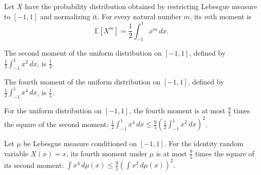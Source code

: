 \begin{theorem}
\label{FABL.integral_pow_uniformIntervalMeasure}
\leanok
{}
Let $X$ have the probability distribution obtained by restricting Lebesgue measure to
$[-1,1]$ and normalizing it. For every natural number $m$, its $m$th moment is
\[\mathbb E[X^m]=\frac12\int_{-1}^{1}x^m\,dx.\]
\end{theorem}

\begin{theorem}
\label{FABL.uniformIntervalMoment_two}
\leanok
{}
The second moment of the uniform distribution on $[-1,1]$, defined by
$\frac12\int_{-1}^{1}x^2\,dx$, is $\frac13$.
\end{theorem}

\begin{theorem}
\label{FABL.uniformIntervalMoment_four}
\leanok
{}
The fourth moment of the uniform distribution on $[-1,1]$, defined by
$\frac12\int_{-1}^{1}x^4\,dx$, is $\frac15$.
\end{theorem}

\begin{theorem}
\label{FABL.uniformInterval_isNineFifthsReasonable}
\leanok
{}
For the uniform distribution on $[-1,1]$, the fourth moment is at most $\frac95$ times
the square of the second moment:
$\frac12\int_{-1}^{1}x^4\,dx\leq\frac95\left(\frac12\int_{-1}^{1}x^2\,dx\right)^2$.
\end{theorem}

\begin{theorem}
\label{FABL.uniformIntervalMeasure_isNineFifthsReasonable}
\leanok
{}
Let $\mu$ be Lebesgue measure conditioned on $[-1,1]$. For the identity random variable
$X(x)=x$, its fourth moment under $\mu$ is at most $\frac95$ times the square of its
second moment: $\int x^4\,d\mu(x)\leq\frac95\left(\int x^2\,d\mu(x)\right)^2$.
\end{theorem}

